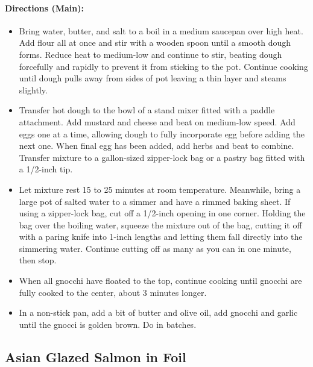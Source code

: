 \documentclass{article}
\begin{document}
\paragraph{Directions (Main):}
\begin{itemize}
    \item Bring water, butter, and salt to a boil in a medium saucepan over high heat. Add flour all at once and stir with a wooden spoon until a smooth dough forms. Reduce heat to medium-low and continue to stir, beating dough forcefully and rapidly to prevent it from sticking to the pot. Continue cooking until dough pulls away from sides of pot leaving a thin layer and steams slightly.
    \item Transfer hot dough to the bowl of a stand mixer fitted with a paddle attachment. Add mustard and cheese and beat on medium-low speed. Add eggs one at a time, allowing dough to fully incorporate egg before adding the next one. When final egg has been added, add herbs and beat to combine. Transfer mixture to a gallon-sized zipper-lock bag or a pastry bag fitted with a 1/2-inch tip.
    \item Let mixture rest 15 to 25 minutes at room temperature. Meanwhile, bring a large pot of salted water to a simmer and have a rimmed baking sheet. If using a zipper-lock bag, cut off a 1/2-inch opening in one corner. Holding the bag over the boiling water, squeeze the mixture out of the bag, cutting it off with a paring knife into 1-inch lengths and letting them fall directly into the simmering water. Continue cutting off as many as you can in one minute, then stop.
    \item When all gnocchi have floated to the top, continue cooking until gnocchi are fully cooked to the center, about 3 minutes longer.
    \item In a non-stick pan, add a bit of butter and olive oil, add gnocchi and garlic until the gnocci is golden brown. Do in batches.
\end{itemize} 

\subsection{Asian Glazed Salmon in Foil}
\end{document}
